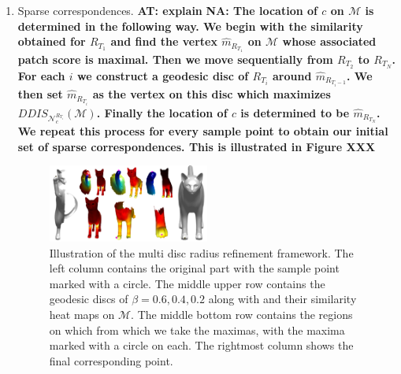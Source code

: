 \documentclass[10pt,twocolumn,letterpaper]{article}
\newcommand{\colornote}[3]{{\color{#1}\bf{#2: #3}\normalfont}}
\newcommand{\colornote}[3]{}
\newcommand {\ayellet}[1]{\colornote{blue}{AT}{#1}}
\newcommand {\nadav}[1]{\colornote{red}{NA}{#1}}
\begin{document}
\begin{enumerate}
    We will elaborate on how this is performed in Section~\ref{sec:similarity}.
    
    \nadav{proposed text for 'multi-scale' approach - seems more natural here and in the sparse correspondence section:
    The latter 2 steps are performed for $N$ different values of $R_T$, $R_{T_1}>...>R_{T_N}$, and thus we obtain for each sample N different similarity scores $DDIS_{\mathcal{N}^{R_{T_i}}_{c}}(\mathcal{M})$.}

    
    \item{Sparse correspondences.}
    \ayellet{explain}
    \nadav{The location of $c$ on $\mathcal{M}$ is determined in the following way. We begin with the similarity obtained for $R_{T_1}$ and find the vertex $\hat{m}_{R_{T_1}}$ on $\mathcal{M}$ whose associated patch score is maximal. Then we move sequentially from $R_{T_2}$ to $R_{T_N}$. For each $i$ we construct a geodesic disc of $R_{T_i}$ around $\hat{m}_{R_{T_i-1}}$. We then set $\hat{m}_{R_{T_i}}$ as the vertex on this disc which maximizes $DDIS_{\mathcal{N}^{R_{T_i}}_{c}}(\mathcal{M})$. Finally the location of $c$ is determined to be $\hat{m}_{R_{T_N}}$. We repeat this process for every sample point to obtain our initial set of sparse correspondences. This is illustrated in Figure XXX}
    
    \begin{figure}[htb]
	\includegraphics[width=0.5\textwidth]{figures/MultiScaleDis.png}
	\caption{Illustration of the multi disc radius refinement framework. The left column contains the original part with the sample point marked with a circle. The middle upper row contains the geodesic discs of $\beta = 0.6,0.4,0.2$ along with and their similarity heat maps on $\mathcal{M}$. The middle bottom row contains the regions on which from which we take the maximas, with the maxima marked with a circle on each. The rightmost column shows the final corresponding point.}
    \end{figure}


\end{enumerate}
\end{document}
